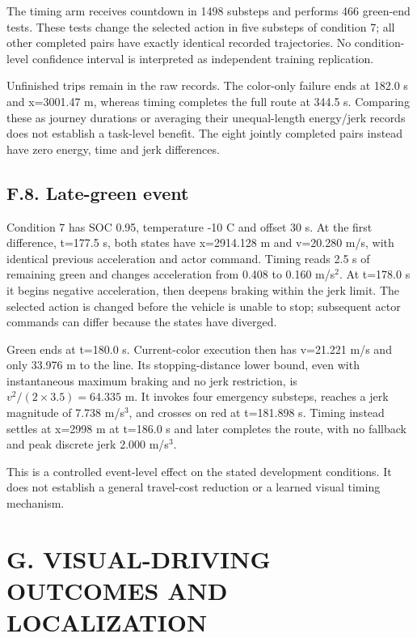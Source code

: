 \documentclass[letterpaper,journal,onecolumn]{IEEEtran}
\begin{document}
The timing arm receives countdown in 1498 substeps and performs 466 green-end tests. These tests change the selected action in five substeps of condition 7; all other completed pairs have exactly identical recorded trajectories. No condition-level confidence interval is interpreted as independent training replication.

Unfinished trips remain in the raw records. The color-only failure ends at 182.0 s and x=3001.47 m, whereas timing completes the full route at 344.5 s. Comparing these as journey durations or averaging their unequal-length energy/jerk records does not establish a task-level benefit. The eight jointly completed pairs instead have zero energy, time and jerk differences.

\subsection*{F.8. Late-green event}

Condition 7 has SOC 0.95, temperature -10 \textdegree{}C and offset 30 s. At the first difference, t=177.5 s, both states have x=2914.128 m and v=20.280 m/s, with identical previous acceleration and actor command. Timing reads 2.5 s of remaining green and changes acceleration from 0.408 to 0.160 m/s\(^2\). At t=178.0 s it begins negative acceleration, then deepens braking within the jerk limit. The selected action is changed before the vehicle is unable to stop; subsequent actor commands can differ because the states have diverged.

Green ends at t=180.0 s. Current-color execution then has v=21.221 m/s and only 33.976 m to the line. Its stopping-distance lower bound, even with instantaneous maximum braking and no jerk restriction, is \(v^2/(2\times3.5)=64.335\) m. It invokes four emergency substeps, reaches a jerk magnitude of 7.738 m/s\(^3\), and crosses on red at t=181.898 s. Timing instead settles at x=2998 m at t=186.0 s and later completes the route, with no fallback and peak discrete jerk 2.000 m/s\(^3\).

This is a controlled event-level effect on the stated development conditions. It does not establish a general travel-cost reduction or a learned visual timing mechanism.

\FloatBarrier{}\section*{G. VISUAL-DRIVING OUTCOMES AND LOCALIZATION}\setcounter{subsection}{0}
\end{document}
